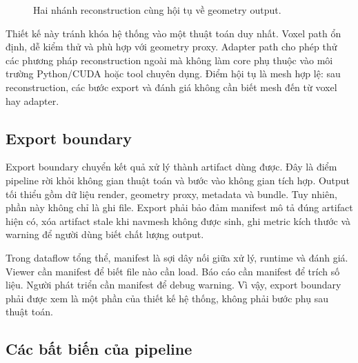 \begin{figure}[H]
\centering
{}
\caption{Hai nhánh reconstruction cùng hội tụ về geometry output.}
\end{figure}

Thiết kế này tránh khóa hệ thống vào một thuật toán duy nhất. Voxel path ổn định, dễ kiểm thử và phù hợp với geometry proxy. Adapter path cho phép thử các phương pháp reconstruction ngoài mà không làm core phụ thuộc vào môi trường Python/CUDA hoặc tool chuyên dụng. Điểm hội tụ là mesh hợp lệ: sau reconstruction, các bước export và đánh giá không cần biết mesh đến từ voxel hay adapter.

\subsection{Export boundary}

Export boundary chuyển kết quả xử lý thành artifact dùng được. Đây là điểm pipeline rời khỏi không gian thuật toán và bước vào không gian tích hợp. Output tối thiểu gồm dữ liệu render, geometry proxy, metadata và bundle. Tuy nhiên, phần này không chỉ là ghi file. Export phải bảo đảm manifest mô tả đúng artifact hiện có, xóa artifact stale khi navmesh không được sinh, ghi metric kích thước và warning để người dùng biết chất lượng output.

Trong dataflow tổng thể, manifest là sợi dây nối giữa xử lý, runtime và đánh giá. Viewer cần manifest để biết file nào cần load. Báo cáo cần manifest để trích số liệu. Người phát triển cần manifest để debug warning. Vì vậy, export boundary phải được xem là một phần của thiết kế hệ thống, không phải bước phụ sau thuật toán.

\subsection{Các bất biến của pipeline}

